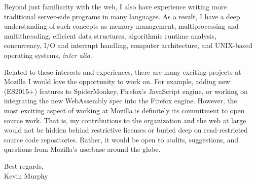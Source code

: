 \documentclass[paper=a4, fontsize=12pt]{scrartcl} %
\begin{document}
Beyond just familiarity with the web, I also have experience writing more traditional server-side programs in many languages.  As a result, I have a deep understanding of such concepts as memory management, multiprocessing and multithreading, efficient data structures, algorithmic runtime analysis, concurrency, I/O and interrupt handling, computer architecture, and UNIX-based operating systems, \textit{inter alia}.

Related to these interests and experiences, there are many exciting projects at Mozilla I would love the opportunity to work on.  For example, adding new (ES2015+) features to SpiderMonkey, Firefox's JavaScript engine, or working on integrating the new WebAssembly spec into the Firefox engine.  However, the most exciting aspect of working at Mozilla is definitely its commitment to open source work.  That is, my contributions to the organization and the web at large would not be hidden behind restrictive licenses or buried deep on read-restricted source code repositories.  Rather, it would be open to audits, suggestions, and questions from Mozilla's userbase around the globe.

\begin{flushright}
Best regards,\\
Kevin Murphy
\end{flushright}
\end{document}
